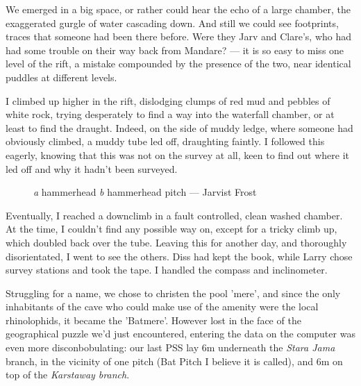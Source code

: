 	We emerged in a big space, or rather could hear the echo of a large chamber, the exaggerated gurgle of water cascading down. And still we could see footprints, traces that someone had been there before. Were they Jarv and Clare's, who had had some trouble on their way back from Mandare? --- it is so easy to miss one level of the rift, a mistake compounded by the presence of the two, near identical puddles at different levels. 
	
	I climbed up higher in the rift, dislodging clumps of red mud and pebbles of white rock, trying desperately to find a way into the waterfall chamber, or at least to find the draught. Indeed, on the side of muddy ledge, where someone had obviously climbed, a muddy tube led off, draughting faintly. I followed this eagerly, knowing that this was not on the survey at all, keen to find out where it led off and why it hadn't been surveyed. 
	
\begin{figure*}[t!]
	\checkoddpage \ifoddpage \forcerectofloat \else \forceversofloat \fi
	\centering
	\begin{subfigure}[t]{0.328\textwidth}
		\centering
		 \caption{}\label{information}
	\end{subfigure}
  	 \hfill
   	 \begin{subfigure}[t]{0.662\textwidth}
        		\centering
        		\caption{} \label{stretcher prepared}
        \end{subfigure}
	\caption{
	 	  \emph{a} hammerhead
   		 \emph{b} hammerhead pitch --- Jarvist Frost}
\end{figure*}
	
	
	Eventually, I reached a downclimb in a fault controlled, clean washed chamber. At the time, I couldn't find any possible way on, except for a tricky climb up, which doubled back over the tube. Leaving this for another day, and thoroughly disorientated, I went to see the others. Diss had kept the book, while Larry chose survey stations and took the tape. I handled the compass and inclinometer. 
	
	Struggling for a name, we chose to christen the pool 'mere', and since the only inhabitants of the cave who could make use of the amenity were the local rhinolophids, it became the 'Batmere'. However lost in the face of the geographical puzzle we'd just encountered, entering the data on the computer was even more disconbobulating: our last PSS lay 6m underneath the \emph{Stara Jama} branch, in the vicinity of one pitch (Bat Pitch I believe it is called), and 6m on top of the \emph{Karstaway branch}.
	
